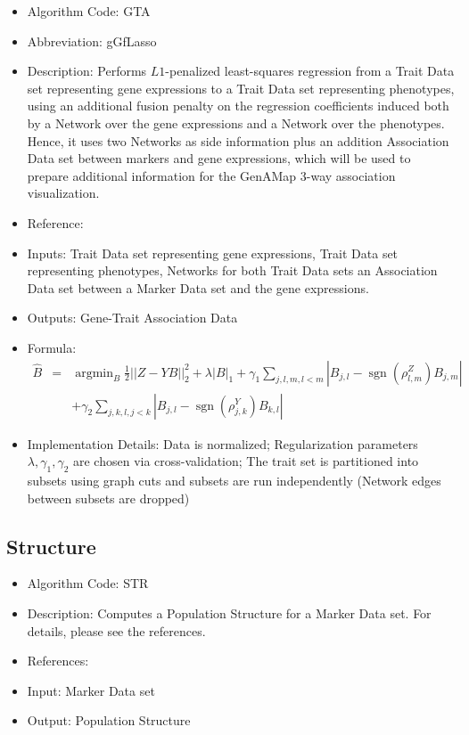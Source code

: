 \documentclass{article}
\newcommand{\sgn}{\operatorname{sgn}}
\newcommand{\argmin}{\operatorname{argmin}}
\begin{document}
\begin{itemize}
\item Algorithm Code: GTA
\item Abbreviation: gGfLasso
\item Description: Performs $L1$-penalized least-squares regression from a Trait Data set representing gene expressions to a Trait Data set representing phenotypes, using an additional fusion penalty on the regression coefficients induced both by a Network over the gene expressions and a Network over the phenotypes. Hence, it uses two Networks as side information plus an addition Association Data set between markers and gene expressions, which will be used to prepare additional information for the GenAMap 3-way association visualization.
\item Reference: \cite{gGFLasso}
\item Inputs: Trait Data set representing gene expressions, Trait Data set representing phenotypes, Networks for both Trait Data sets an Association Data set between a Marker Data set and the gene expressions.
\item Outputs: Gene-Trait Association Data
\item Formula:
\begin{eqnarray*}
\hat{B} &=& \argmin_{B} \frac{1}{2}||Z - YB||_2^2 + \lambda|B|_1 + \gamma_1\sum_{j,l,m, l < m}|B_{j,l} - \sgn(\rho^Z_{l,m})B_{j,m}| \\
&& + \gamma_2\sum_{j,k,l, j < k}|B_{j,l} - \sgn(\rho^Y_{j,k})B_{k,l}|
\end{eqnarray*}
\item Implementation Details: Data is normalized; Regularization parameters $\lambda, \gamma_1,\gamma_2$ are chosen via cross-validation; The trait set is partitioned into subsets using graph cuts and subsets are run independently (Network edges between subsets are dropped)
\end{itemize}

\subsection{Structure}

\begin{itemize}
\item Algorithm Code: STR
\item Description: Computes a Population Structure for a Marker Data set. For details, please see the references.
\item References: \cite{Structure} \cite{StructureLink}
\item Input: Marker Data set
\item Output: Population Structure
\end{itemize}
\end{document}

